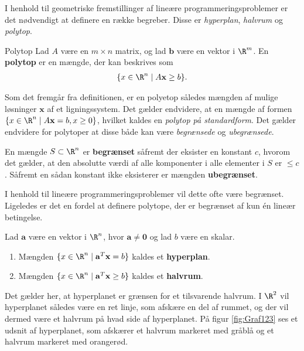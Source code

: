 I henhold til geometriske fremstillinger af lineære programmeringsproblemer er det nødvendigt at definere en række begreber.
Disse er \textit{hyperplan}, \textit{halvrum} og \textit{polytop}.
%
\begin{defn}{}{Polytop}
Lad $A$ være en $m \times n$ matrix, og lad $\mathbf{b}$ være en vektor i  $\R^m$.
En \textbf{polytop} er en mængde, der kan beskrives som 
\begin{align*}
\{x\in \R^n \mid A\mathbf{x}\geq b\}.
\end{align*}
%
\end{defn}
\noindent
%
Som det fremgår fra definitionen, er en polyetop således mængden af mulige løsninger $\mathbf{x}$ af et ligningssystem.
Det gælder endvidere, at en mængde af formen $ \{x \in \R^n \mid A\textbf{x}=b,x \geq 0 \}$, hvilket kaldes en \textit{polytop på standardform}. 
%
Det gælder endvidere for polytoper at disse både kan være \textit{begrænsede} og \textit{ubegrænsede}.
%
\begin{defn}{}{}
En mængde $S \subset \R^n$ er \textbf{begrænset} såfremt der eksister en konstant $c$, hvorom det gælder, at den absolutte værdi af alle komponenter i alle elementer i $S$ er $\leq c$. 
Såfremt en sådan konstant ikke eksisterer er mængden \textbf{ubegrænset}. 
\end{defn}
\noindent
%
%
I henhold til lineære programmeringsproblemer vil dette ofte være begrænset.
Ligeledes er det en fordel at definere polytope, der er begrænset af kun én lineær betingelse. 
%
%
\begin{defn}{}{}
Lad $\mathbf{a}$ være en vektor i $\R^n$, hvor $\mathbf{a} \neq \mathbf{0}$ og lad $b$ være en skalar.
\begin{enumerate}[label=(\alph*)]
\item Mængden $\{x \in \R^n \mid \mathbf{a}^T \mathbf{x}=b\}$ kaldes et \textbf{hyperplan}.
\item Mængden $\{x \in \R^n \mid \mathbf{a}^T \mathbf{x} \geq b\}$ kaldes et \textbf{halvrum}.
\end{enumerate}
\end{defn}
\noindent
%
Det gælder her, at hyperplanet er grænsen for et tilsvarende halvrum.
I $\R^2$ vil hyperplanet således være en ret linje, som afskære en del af rummet, og der vil dermed være et halvrum på hvad side af hyperplanet.
På figur \ref{fig:Graf123} ses et udsnit af hyperplanet, som afskærer et halvrum markeret med gråblå og et halvrum markeret med orangerød. 

